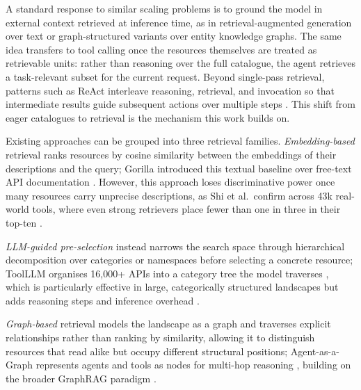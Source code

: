 \documentclass[10pt,twocolumn]{article}
\begin{document}
A standard response to similar scaling problems is to ground the model in external context retrieved at inference time, as in retrieval-augmented generation over text \citep{lewis_retrieval-augmented_2020} or graph-structured variants over entity knowledge graphs. The same idea transfers to tool calling once the resources themselves are treated as retrievable units: rather than reasoning over the full catalogue, the agent retrieves a task-relevant subset for the current request. Beyond single-pass retrieval, patterns such as ReAct interleave reasoning, retrieval, and invocation so that intermediate results guide subsequent actions over multiple steps \citep{yao_react_2022}. This shift from eager catalogues to retrieval is the mechanism this work builds on.

Existing approaches can be grouped into three retrieval families. \emph{Embedding-based} retrieval ranks resources by cosine similarity between the embeddings of their descriptions and the query; Gorilla introduced this textual baseline over free-text API documentation \citep{gonzalez_gorilla_2024}. However, this approach loses discriminative power once many resources carry unprecise descriptions, as Shi et al.\ confirm across 43k real-world tools, where even strong retrievers place fewer than one in three in their top-ten \citep{shi_retrieval_2025}. 

\emph{LLM-guided pre-selection} instead narrows the search space through hierarchical decomposition over categories or namespaces before selecting a concrete resource; ToolLLM organises 16{,}000+ APIs into a category tree the model traverses \citep{qin_toolllm_nodate}, which is particularly effective in large, categorically structured landscapes but adds reasoning steps and inference overhead \citep{xu_llm-based_2025}. 

\emph{Graph-based} retrieval models the landscape as a graph and traverses explicit relationships rather than ranking by similarity, allowing it to distinguish resources that read alike but occupy different structural positions; Agent-as-a-Graph represents agents and tools as nodes for multi-hop reasoning \citep{nizar_agent-as--graph_2026,qu_colt_2024}, building on the broader GraphRAG paradigm \citep{edge2024from}.
\end{document}
